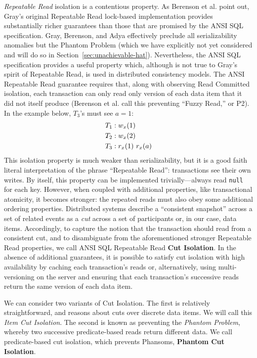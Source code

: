 \textit{Repeatable Read} isolation is a contentious property. As
Berenson et al. point out, Gray's original Repeatable Read lock-based
implementation provides substantially richer guarantees than those
that are promised by the ANSI SQL specification. Gray, Berenson, and
Adya effectively preclude all serializability anomalies but the
Phantom Problem (which we have explicitly not yet considered and will
do so in Section~\ref{sec:unachievable-hat}). Nevertheless, the ANSI
SQL specification provides a useful property which, although is not
true to Gray's spirit of Repeatable Read, is used in distributed
consistency models. The ANSI Repeatable Read guarantee requires that,
along with observing Read Committed isolation, each transaction can
only read only version of each data item that it did not itself
produce (Berenson et al. call this preventing ``Fuzzy Read,'' or
P2). In the example below, $T_3$'s must see $a=1$:
\begin{align*}
\small
T_1 &: w_x(1)
\\T_2 &: w_x(2)
\\T_3 &: r_x(1)~r_x(a)
\end{align*}
This isolation property is much weaker than serializability, but it is
a good faith literal interpretation of the phrase ``Repeatable Read'':
transactions see their own writes. By itself, this property can be
implemented trivially---always read \texttt{null} for each
key. However, when coupled with additional properties, like
transactional atomicity, it becomes stronger: the repeated reads must
also obey some additional ordering properties. Distributed systems
describe a ``consistent snapshot'' across a set of related events as a
\textit{cut} across a set of participants or, in our case, data
items. Accordingly, to capture the notion that the transaction should
read from a consistent cut, and to disambiguate from the
aforementioned stronger Repeatable Read properties, we call ANSI SQL
Repeatable Read \textbf{Cut Isolation}. In the absence of additional
guarantees, it is possible to satisfy cut isolation with high
availability by caching each transaction's reads or, alternatively,
using multi-versioning on the server and ensuring that each
transaction's successive reads return the same version of each data
item.

We can consider two variants of Cut Isolation. The first is relatively
straightforward, and reasons about cuts over discrete data items. We
will call this \textit{Item Cut Isolation}. The second is known as
preventing the \textit{Phantom Problem}, whereby two successive
predicate-based reads return different data. We call predicate-based
cut isolation, which prevents Phansoms, \textbf{Phantom Cut
  Isolation}.

